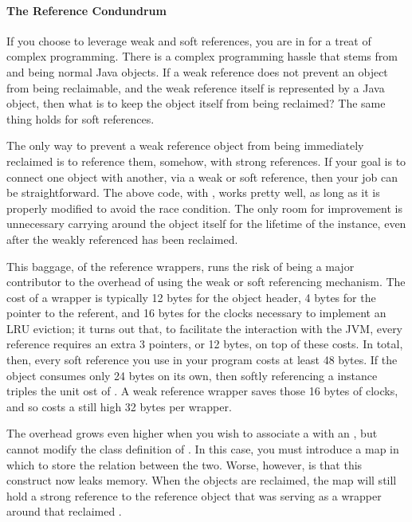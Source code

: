 \paragraph{The Reference Condundrum}

If you choose to leverage weak and soft references, you are in for a treat of
complex programming. There is a complex programming hassle that stems from
 and  being normal Java objects. If a
weak reference does not prevent an object from being reclaimable, and the weak
reference itself is represented by a Java object, then what is to keep the
 object itself from being reclaimed? The same thing holds
for soft references.

The only way to prevent a weak reference object from being immediately reclaimed
is to reference them, somehow, with strong references. If your goal is to
connect one object with another, via a weak or soft reference, then your job can be
straightforward. The above code, with , works pretty well, as long
as it is properly modified to avoid the race condition. The only room for
improvement is unnecessary carrying around the  object
itself for the lifetime of the  instance, even after the weakly
referenced  has been reclaimed.

This baggage, of the reference wrappers, runs the risk of being a major
contributor to the overhead of using the weak or soft referencing mechanism. The
cost of a  wrapper is typically 12 bytes for the object
header, 4 bytes for the pointer to the referent, and 16 bytes for the clocks
necessary to implement an LRU eviction; it turns out that, to facilitate the
interaction with the JVM, every reference requires an extra 3 pointers, or 12
bytes, on top of these costs. In total, then, every soft reference you use in
your program costs at least 48 bytes. If the  object consumes only 24
bytes on its own, then softly referencing a  instance triples the unit
ost of . A weak reference wrapper saves those 16 bytes of clocks, and
so costs a still high 32 bytes per wrapper.

The overhead grows even higher when you wish to associate a 
with an , but cannot modify the class definition of . In this case, you
must introduce a map in which to store the relation between the two. Worse,
however, is that this construct now leaks memory. When the  objects are
reclaimed, the map will still hold a strong reference to the reference object
that was serving as a wrapper around that reclaimed .


